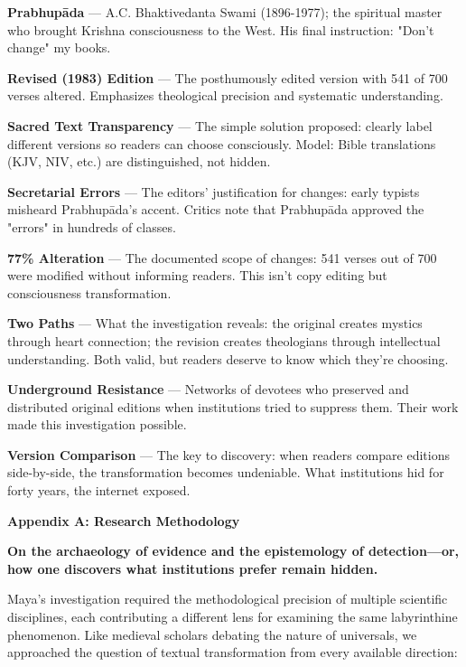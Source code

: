 \documentclass[11pt,twoside]{book}
\makeatletter
\def\cleardoublepage{\clearpage\if@twoside \ifodd\c@page\else\hbox{}\thispagestyle{empty}\newpage\if@twocolumn\hbox{}\newpage\fi\fi\fi}
\makeatother
\begin{document}
\textbf{\textbf{Prabhupāda}} — A.C. Bhaktivedanta Swami (1896-1977); the spiritual master who brought Krishna consciousness to the West. His final instruction: "Don't change" my books.

\textbf{\textbf{Revised (1983) Edition}} — The posthumously edited version with 541 of 700 verses altered. Emphasizes theological precision and systematic understanding.

\textbf{\textbf{Sacred Text Transparency}} — The simple solution proposed: clearly label different versions so readers can choose consciously. Model: Bible translations (KJV, NIV, etc.) are distinguished, not hidden.

\textbf{\textbf{Secretarial Errors}} — The editors' justification for changes: early typists misheard Prabhupāda's accent. Critics note that Prabhupāda approved the "errors" in hundreds of classes.

\textbf{\textbf{77\% Alteration}} — The documented scope of changes: 541 verses out of 700 were modified without informing readers. This isn't copy editing but consciousness transformation.

\textbf{\textbf{Two Paths}} — What the investigation reveals: the original creates mystics through heart connection; the revision creates theologians through intellectual understanding. Both valid, but readers deserve to know which they're choosing.

\textbf{\textbf{Underground Resistance}} — Networks of devotees who preserved and distributed original editions when institutions tried to suppress them. Their work made this investigation possible.

\textbf{\textbf{Version Comparison}} — The key to discovery: when readers compare editions side-by-side, the transformation becomes undeniable. What institutions hid for forty years, the internet exposed.

\clearpage
\thispagestyle{empty}
\mbox{}
\newpage
\pagestyle{sectionopening}
\cleardoublepage
\thispagestyle{empty}
\vspace*{0.25\textheight}
\begin{center}
{\Huge\bfseries Appendix A: Research Methodology}
\end{center}
\vspace*{\fill}
\cleardoublepage

\textbf{On the archaeology of evidence and the epistemology of detection—or, how one discovers what institutions prefer remain hidden.}

Maya's investigation required the methodological precision of multiple scientific disciplines, each contributing a different lens for examining the same labyrinthine phenomenon. Like medieval scholars debating the nature of universals, we approached the question of textual transformation from every available direction:
\end{document}
